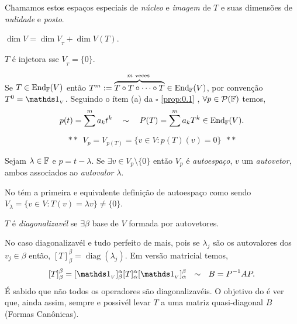 \begin{note}
    Chamamos estos espaços especiais de \emph{núcleo} e \emph{imagem} de \(T\) e suas dimensões de \emph{nulidade} e \emph{posto}. 
\end{note}

\begin{theorem}
    \(\dim V = \dim V_{_T} + \dim V(T)\). 
\end{theorem}

\begin{proposition}
    \(T \) é injetora sse \(V_{_T} = \{0\}\). 
\end{proposition}


\begin{note}
    Se \(T\in \operatorname{End}_{\mathbb{F}}(V)\) então \(T^m := \overbrace{T\circ T \circ \cdots \circ T}^{m\text{ veces }} \in \operatorname{End}_{\mathbb{F}}(V)\), por convenção \(T^0 = \id_{_V}\). Seguindo o ítem (a) da \(\square \) \ref{prop:0.1} , \(\forall p \in \mathcal{P}(\mathbb{F})\) temos,  
    \[p(t) = \sum^m a_kt^k \ \ \ \sim \ \ \ P(T) = \sum^m a_kT^k \in \operatorname{End}_{\mathbb{F}}(V).\] 
\end{note}

\vspace{-0.6cm}
\[** \ \ V_{p}= V_{{p(T)}} = \{v\in V: p(T)(v) = 0\} \ \ **\]

\begin{definition}
    Sejam \(\lambda \in \mathbb{F}\) e \(p = t-\lambda \). Se \(\exists v\in V_p \setminus\{0\}\) então \(V_p\) é \emph{autoespaço}, \(v\) um \emph{autovetor}, ambos associados ao \emph{autovalor} \(\lambda\). 
\end{definition}

\begin{note}
    No \cite[Pág. 208]{MA719} tém a primeira e equivalente definição de autoespaço como sendo \(V_\lambda = \{v\in V: T(v) = \lambda v \}\neq \{0\}\). 
\end{note}

\begin{definition}
    \(T\) é \emph{diagonalizavél} se \(\exists \beta \) base de \(V\) formada por autovetores.
\end{definition}

\begin{note}
    No caso diagonalizavél e tudo perfeito de mais, pois se \(\lambda_j\) são os autovalores dos \(v_j \in \beta \) então, \([T]^\beta_\beta = \operatorname{diag}(\lambda_j)\). Em versão matricial temos,
    \[[T]^\beta_\beta = [\id_{_V}]^\alpha_\beta [T]^\alpha_\alpha [\id_{_V}]^\beta_\alpha \ \ \sim \ \ B = P^{-1} A P.\]
    É sabido que não todos os operadores são diagonalizavéis. O objetivo do \cite[Cap. 8]{MA719} é ver que, ainda assim, sempre e possivél levar \(T\) a uma matriz quasi-diagonal $B$ (Formas Canônicas). 
\end{note}


